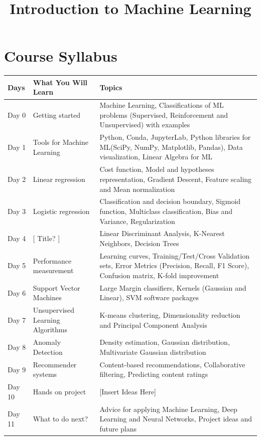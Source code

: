 \documentclass[11pt]{article}
\title{Introduction to Machine Learning}
\date{}
\begin{document}
\maketitle
\section{Course Syllabus}
\begin{center}
\begin{tabular}{|M{1.2cm}|M{4cm}|M{12cm}|}
\hline
Days & What You Will Learn&Topics\\ \hline
Day 0 &Getting started &Machine Learning, Classifications of ML problems (Supervised, Reinforcement and Unsupervised) with examples\\ \hline
Day 1 & Tools for Machine Learning &Python, Conda, JupyterLab, Python libraries for ML(SciPy, NumPy, Matplotlib, Pandas), Data visualization, Linear Algebra for ML\\ \hline
Day 2 & Linear regression &Cost function, Model and hypotheses representation, Gradient Descent, Feature scaling and Mean normalization\\ \hline
Day 3 & Logistic regression &Classification and decision boundary, Sigmoid function, Multiclass classification, Bias and Variance, Regularization\\ \hline
Day 4 &[ Title? ] &Linear Discriminant Analysis, K-Nearest Neighbors, Decision Trees\\ \hline
Day 5 & Performance measurement &Learning curves, Training/Test/Cross Validation sets, Error Metrics (Precision, Recall, F1 Score), Confusion matrix, K-fold improvement\\ \hline
Day 6 &Support Vector Machines&Large Margin classifiers, Kernels (Gaussian and Linear), SVM software packages\\ \hline
Day 7 & Unsupervised Learning Algorithms & K-means clustering, Dimensionality reduction and Principal Component Analysis\\ \hline
Day 8 & Anomaly Detection& Density estimation, Gaussian distribution, Multivariate Gaussian distribution\\ \hline
Day 9 &Recommender systems & Content-based recommendations, Collaborative filtering, Predicting content ratings\\ \hline
Day 10 & Hands on project & [Insert Ideas Here]\\ \hline
Day 11 & What to do next? &Advice for applying Machine Learning, Deep Learning and Neural Networks, Project ideas and future plans\\ \hline
\end{tabular}
\end{center}
\end{document}
